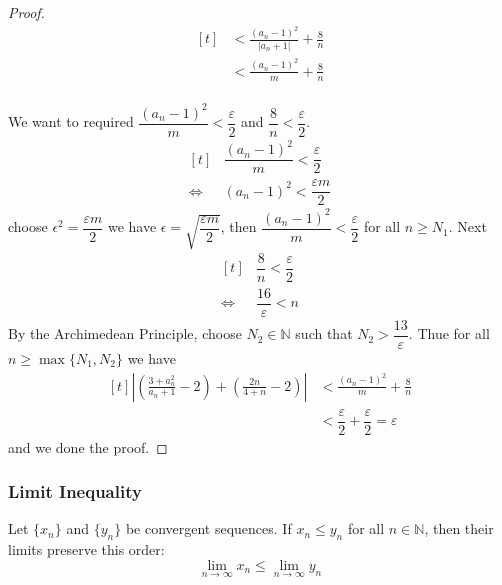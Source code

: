 \documentclass[
	UTF-8,
	11pt, %
	a4paper, %
]{LegrandOrangeBook}
\begin{document}
\begin{example}
\begin{proof}
$$\begin{aligned}[t]
            &< \frac{(a_n - 1)^2}{|a_n + 1|} + \frac{8}{n} \\
            &< \frac{(a_n - 1)^2}{m} + \frac{8}{n}
        \end{aligned}
        $$\\
        We want to required $\dfrac{(a_n - 1)^2}{m} < \dfrac{\varepsilon}{2}$ 
        and $\dfrac{8}{n} < \dfrac{\varepsilon}{2}$.
        $$
        \begin{aligned}[t]
            &\dfrac{(a_n - 1)^2}{m} < \dfrac{\varepsilon}{2} \\
            \iff &(a_n - 1)^2 < \dfrac{\varepsilon m}{2}
        \end{aligned}
        $$
        choose $\epsilon^2 = \dfrac{\varepsilon m}{2}$ we have $\epsilon = \sqrt{\dfrac{\varepsilon m}{2}}$, 
        then $\dfrac{(a_n - 1)^2}{m} < \dfrac{\varepsilon}{2}$ for all $n \geq N_1$. Next 
        $$
        \begin{aligned}[t]
            &\dfrac{8}{n} < \dfrac{\varepsilon}{2} \\
            \iff & \dfrac{16}{\varepsilon} < n
        \end{aligned}
        $$
        By the Archimedean Principle, 
        choose $N_2 \in \mathbb{N}$ such that $N_2 > \dfrac{13}{\varepsilon}$.
        Thue for all $n \geq \max\{N_1, N_2\}$ we have 
        $$
        \begin{aligned}[t]
            \left| \left( \frac{3 + a_n^2}{a_n + 1} - 2 \right) + \left( \frac{2n}{4+n} - 2 \right) \right| 
            &< \frac{(a_n - 1)^2}{m} + \frac{8}{n}\\
            &< \dfrac{\varepsilon}{2} + \dfrac{\varepsilon}{2} = \varepsilon
        \end{aligned}
        $$
        and we done the proof.
    \end{proof}
    \end{example}

    \newpage

    \subsubsection{Limit Inequality}
    
    \begin{theorem}
    Let $\{x_n\}$ and $\{y_n\}$ be convergent sequences. If $x_n \le y_n$ for all $n \in \mathbb{N}$, then their limits preserve this order:
    \[ \lim_{n \to \infty} x_n \le \lim_{n \to \infty} y_n \]
    \end{theorem}
\end{document}
